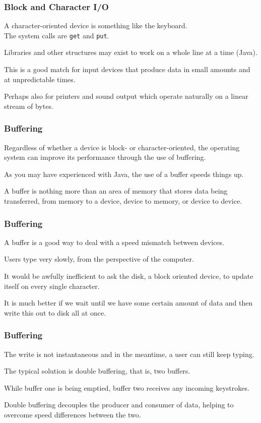 \begin{frame}
\frametitle{Block and Character I/O}

A character-oriented device is something like the keyboard.\\
\quad The system calls are \texttt{get} and \texttt{put}. 

Libraries and other structures may exist to work on a whole line at a time (Java). 

This is a good match for input devices that produce data in small amounts and at unpredictable times. 

Perhaps also for printers and sound output which operate naturally on a linear stream of bytes.

\end{frame}

\begin{frame}
\frametitle{Buffering}

Regardless of whether a device is block- or character-oriented, the operating system can improve its performance through the use of buffering. 

As you may have experienced with Java, the use of a buffer speeds things up.

A buffer is nothing more than an area of memory that stores data being transferred, from memory to a device, device to memory, or device to device. 

\end{frame}

\begin{frame}
\frametitle{Buffering}

A buffer is a good way to deal with a speed mismatch between devices. 

Users type very slowly, from the perspective of the computer. 

It would be awfully inefficient to ask the disk, a block oriented device, to update itself on every single character. 

It is much better if we wait until we have some certain amount of data and then write this out to disk all at once.

\end{frame}

\begin{frame}
\frametitle{Buffering}

The write is not instantaneous and in the meantime, a user can still keep typing. 

The typical solution is \alert{double buffering}, that is, two buffers. 

While buffer one is being emptied, buffer two receives any incoming keystrokes. 

Double buffering decouples the producer and consumer of data, helping to overcome speed differences between the two.

\end{frame}

